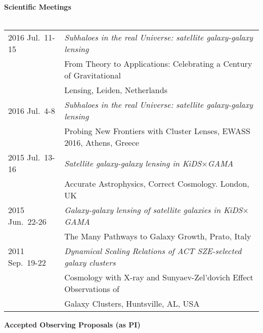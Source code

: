 \documentclass[11pt]{article}
\begin{document}
\pagebreak
\noindent
{\bf\Large Scientific Meetings}\\

\vspace{0.1cm}
\hspace{-0.4cm}{\bf Contributed Talks}\\
\vspace{-0.2cm}
\begin{table}[h!]
\begin{tabular}{l l}

2016 Jul.~11-15 & {\it Subhaloes in the real Universe: satellite galaxy-galaxy lensing}\\
                & From Theory to Applications: Celebrating a Century of Gravitational\\
                & Lensing, Leiden, Netherlands\\
2016 Jul.~4-8   & {\it Subhaloes in the real Universe: satellite galaxy-galaxy lensing}\\
                & Probing New Frontiers with Cluster Lenses, EWASS 2016, Athens, Greece\\
2015 Jul.~13-16 & {\it Satellite galaxy-galaxy lensing in KiDS$\times$GAMA}\\
                & Accurate Astrophysics, Correct Cosmology. London, UK\\
2015 Jun.~22-26 & {\it Galaxy-galaxy lensing of satellite galaxies in KiDS$\times$GAMA}\\
                & The Many Pathways to Galaxy Growth, Prato, Italy\\
2011 Sep.~19-22 & {\it Dynamical Scaling Relations of ACT SZE-selected galaxy clusters}\\
                & Cosmology with X-ray and Sunyaev-Zel'dovich Effect Observations of\\
                & Galaxy Clusters, Huntsville, AL, USA

\end{tabular}
\end{table}


\noindent
{\bf\Large Accepted Observing Proposals (as PI)}\\
\vspace{-0.2cm}
\end{document}
